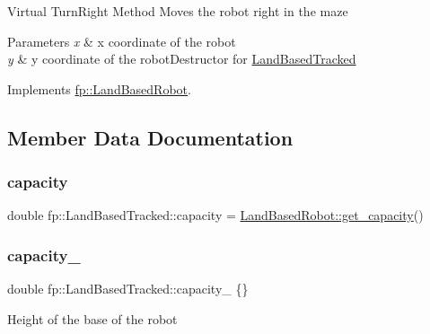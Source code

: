 Virtual Turn\+Right Method Moves the robot right in the maze 
\begin{DoxyParams}{Parameters}
{\em x} & x coordinate of the robot \\
\hline
{\em y} & y coordinate of the robot\+Destructor for \hyperlink{classfp_1_1_land_based_tracked}{Land\+Based\+Tracked} \\
\hline
\end{DoxyParams}


Implements \hyperlink{classfp_1_1_land_based_robot_a7360e4084bc5254f72ab0d3612644907}{fp\+::\+Land\+Based\+Robot}.



\subsection{Member Data Documentation}
\mbox{\label{classfp_1_1_land_based_tracked_a13d92f0fa31949ca268678a7c339d4f7}} 
\subsubsection{\texorpdfstring{capacity}{capacity}}
{\footnotesize\ttfamily double fp\+::\+Land\+Based\+Tracked\+::capacity = \hyperlink{classfp_1_1_land_based_robot_a24c0f6d395f3dfd6bdbcf5a2a9801de1}{Land\+Based\+Robot\+::get\+\_\+capacity}()}

\mbox{\label{classfp_1_1_land_based_tracked_a608f59273d6f0882809fa11dbb1ca325}} 
\subsubsection{\texorpdfstring{capacity\+\_\+}{capacity\_}}
{\footnotesize\ttfamily double fp\+::\+Land\+Based\+Tracked\+::capacity\+\_\+ \{\}\hspace{0.3cm}{\ttfamily [protected]}}

Height of the base of the robot \mbox{\label{classfp_1_1_land_based_tracked_a2efd39a637cc76891f6e8fd1eb84420e}} 
